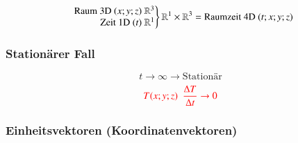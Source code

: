 $$\left.\begin{array}{r@{}}
    \text{Raum 3D ${(x;y;z)}$ }\rreal^3\\
    \text{Zeit 1D ${(t)}$ }\rreal^1
\end{array}\right\rbrace \rreal^{1}\times \rreal^3 = \text{Raumzeit 4D} \text{ } (t;x;y;z)$$


\subsubsection{Stationärer Fall}
$${t \rightarrow \infty \rightarrow \text{Stationär}}$$
$${{\color{red}T(x;y;z) \enspace\frac{\Delta{T}}{\Delta{t}} \rightarrow 0 }}$$


\subsubsection{Einheitsvektoren (Koordinatenvektoren)}


